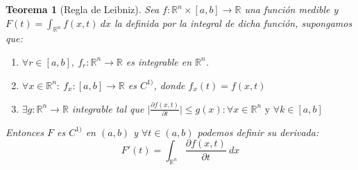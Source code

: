 \documentclass[10pt,a4paper,openright]{book}
\theoremstyle{break}
\newtheorem*{theo}{Teorema}
\newcommand{\dif}[1]{\ d#1}
\begin{document}
\begin{theo}[Regla de Leibniz]
Sea $f: \mathbb{R}^{n} \times \left[a, b\right] \rightarrow \mathbb{R}$ una función medible y $F \left(t\right) = \int_{\mathbb{R}^n} f \left(x, t\right) \dif{x}$ la definida por la integral de dicha función, supongamos que: 
\begin{enumerate}
    \item $\forall r \in \left[a, b\right],\ f_r: \mathbb{R}^{n} \rightarrow \mathbb{R}$ es integrable en $\mathbb{R}^n$.
    \item $\forall x \in \mathbb{R}^n : \ f_x: \left[a, b\right] \rightarrow \mathbb{R}$ es $C^{1)}$, donde $f_x \left(t\right) = f \left(x, t\right)$
    \item $\exists g: \mathbb{R}^n \rightarrow \mathbb{R}$ integrable tal que $\vert \frac{\partial f \left(x, t\right)}{\partial t}\vert \le g \left(x\right) : \forall x \in \mathbb{R}^n \mbox{ y }\forall k \in \left[a, b\right]$
\end{enumerate}
Entonces $F$ es $C^{1)}$ en $\left(a, b\right)$ y $\forall t \in \left(a, b\right)$ podemos definir su derivada: 
$$F' \left(t\right) = \int_{\mathbb{R}^n} \frac{\partial f \left(x, t\right)}{\partial t} \dif{x} $$
\end{theo}
\end{document}
